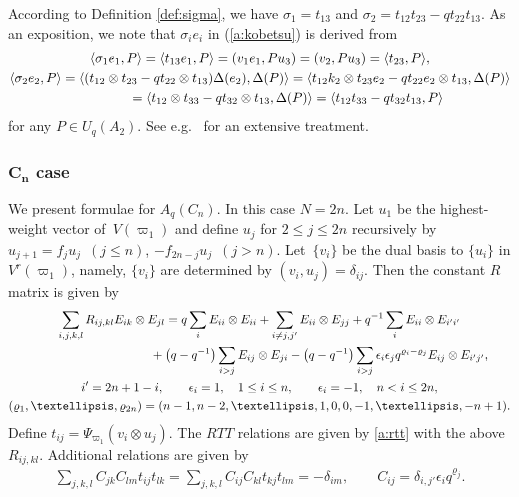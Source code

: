 \documentclass[11pt]{article}
\begin{document}
According to Def\/inition \ref{def:sigma}, we have
$\sigma_1 = t_{13}$ and $\sigma_2 = t_{12}t_{23}-qt_{22}t_{13}$.
As an exposition,  we note that
$\sigma_i e_i$ in (\ref{a:kobetsu}) is  derived from
\begin{gather*}
\langle \sigma_1e_1, P\rangle  =\langle t_{13}e_1, P\rangle
= (v_1e_1, Pu_3) = (v_2, Pu_3) = \langle t_{23}, P \rangle,\\
\langle \sigma_2e_2, P\rangle
= \langle (t_{12}\otimes t_{23}-qt_{22}\otimes t_{13})\Delta(e_2), \Delta(P)\rangle
=\langle t_{12}k_2 \otimes t_{23}e_2- q t_{22}e_2\otimes t_{13}, \Delta(P)\rangle\\
\hphantom{\langle \sigma_2e_2, P\rangle}{}
= \langle t_{12} \otimes t_{33}- q t_{32}\otimes t_{13}, \Delta(P)\rangle
= \langle t_{12}t_{33}- q t_{32} t_{13}, P\rangle
\end{gather*}
for any $P \in U_q(A_2)$.
See e.g.~\cite{NYM} for an extensive treatment.

\subsubsection[$C_n$ case]{$\boldsymbol{C_n}$ case}\label{a:sss:c1}

We present formulae for $A_q(C_n)$. In this case $N=2n$.
Let $u_1$ be the highest-weight vector of~$V(\varpi_1)$ and
def\/ine $u_j$ for $2\le j\le 2n$ recursively by $u_{j+1}=f_ju_j$~$(j\le n)$, $-f_{2n-j}u_j$~$(j>n)$.
Let~$\{v_i\}$ be the dual basis to $\{u_i\}$ in $V^r(\varpi_1)$,
namely, $\{v_i\}$ are determined
by $(v_i,u_j)=\delta_{ij}$. Then the constant $R$ matrix is given by
\begin{gather*}
 \sum_{i,j,k,l}R_{ij,kl}E_{ik}\otimes E_{jl}=
q\sum_i E_{ii}\otimes E_{ii} + \sum_{i\neq j, j'}E_{ii}\otimes E_{jj}
+q^{-1}\sum_i E_{ii}\otimes E_{i'i'}\\
\hphantom{\sum_{i,j,k,l}R_{ij,kl}E_{ik}\otimes E_{jl}=}{}
+\big(q-q^{-1}\big)\sum_{i>j}E_{ij}\otimes E_{ji}
-\big(q-q^{-1}\big)\sum_{i>j}\epsilon_i\epsilon_jq^{\varrho_i-\varrho_j}E_{ij}\otimes E_{i'j'},\\
i' = 2n+1-i,
\qquad
\epsilon_i = 1, \quad 1\le i \le n,\qquad \epsilon_i = -1, \quad n<i \le 2n,\\
(\varrho_1,\ldots, \varrho_{2n}) = (n-1,n-2,\ldots,1,0,0,-1,\ldots, -n+1).
\end{gather*}
Def\/ine $t_{ij}=\Psi_{\varpi_1}(v_i \otimes u_j)$. The $RTT$ relations are given by \eqref{a:rtt}
with the above $R_{ij,kl}$. Additional relations are given by
\begin{gather*}
 \sum_{j,k,l}C_{jk}C_{lm}t_{ij}t_{lk}
= \sum_{j,k,l}C_{ij}C_{kl}t_{kj}t_{lm} = -\delta_{im},
\qquad  C_{ij}= \delta_{i,j'}\epsilon_i q^{\varrho_j}.
\end{gather*}
\end{document}
